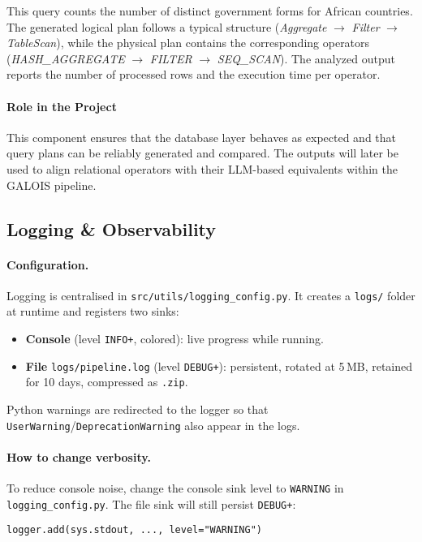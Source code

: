 \documentclass[12pt,a4paper]{article}
\begin{document}
This query counts the number of distinct government forms for African countries.
The generated logical plan follows a typical structure
(\emph{Aggregate} $\rightarrow$ \emph{Filter} $\rightarrow$ \emph{TableScan}),
while the physical plan contains the corresponding operators
(\emph{HASH\_AGGREGATE} $\rightarrow$ \emph{FILTER} $\rightarrow$
\emph{SEQ\_SCAN}). The analyzed output reports the number of processed rows and
the execution time per operator.

\paragraph{Role in the Project}
This component ensures that the database layer behaves as expected and that
query plans can be reliably generated and compared. The outputs will later be
used to align relational operators with their LLM-based equivalents within the
GALOIS pipeline.

\subsection{Logging \& Observability}
\label{subsec:logging-impl}

\paragraph{Configuration.}
Logging is centralised in \texttt{src/utils/logging\_config.py}. It creates a \texttt{logs/} folder at runtime and registers two sinks:
\begin{itemize}
  \item \textbf{Console} (level \texttt{INFO+}, colored): live progress while running.
  \item \textbf{File} \texttt{logs/pipeline.log} (level \texttt{DEBUG+}): persistent, rotated at 5\,MB, retained for 10 days, compressed as \texttt{.zip}.
\end{itemize}
Python warnings are redirected to the logger so that \texttt{UserWarning}/\texttt{DeprecationWarning} also appear in the logs.

\paragraph{How to change verbosity.}
To reduce console noise, change the console sink level to \texttt{WARNING} in
\texttt{logging\_config.py}. The file sink will still persist \texttt{DEBUG+}:
\begin{verbatim}
logger.add(sys.stdout, ..., level="WARNING")
\end{verbatim}
\end{document}
